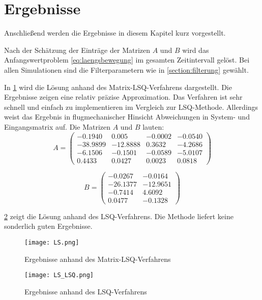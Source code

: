  
 \section{Ergebnisse}
 
Anschließend werden die Ergebnisse in diesem Kapitel kurz vorgestellt.

Nach der Schätzung der Einträge der Matrizen $A$ und $B$ wird das Anfangswertproblem \eqref{eq:laengsbewegung} im gesamten 
Zeitintervall gelöst. Bei allen Simulationen sind die Filterparametern wie in \ref{section:filterung} gewählt.

In \cref{fig:Ergebnisse_zmlsq} wird die Lösung anhand des Matrix-LSQ-Verfahrens dargestellt. Die Ergebnisse zeigen eine 
relativ präzise Approximation. Das Verfahren ist sehr schnell und einfach zu implementieren im Vergleich zur 
LSQ-Methode.  Allerdings weist das Ergebnis in flugmechanischer 
Hinsicht Abweichungen in System- 
und Eingangsmatrix auf. Die Matrizen $A$ und $B$ lauten: 
\begin{equation}
 	A = \begin{pmatrix}
 		-0.1940 & 0.005 & -0.0002 & -0.0540 \\
 		-38.9899 & -12.8888 & 0.3632 & -4.2686 \\
 		-6.1506 & -0.1501 & -0.0589 & -5.0107 \\
 		0.4433 & 0.0427 & 0.0023 & 0.0818
 	\end{pmatrix}
	\nonumber
\end{equation}

\begin{equation}
 	 B = \begin{pmatrix}
 		-0.0267 & -0.0164 \\ 
 		-26.1377 & -12.9651 \\
 		-0.7414 & 4.6092 \\
 		0.0477 & -0.1328
 	\end{pmatrix}
 \nonumber
\end{equation}

 
\cref{fig:Ergebnisse_zlsq} zeigt die Lösung anhand des LSQ-Verfahrens. Die Methode liefert keine sonderlich guten Ergebnisse. 
\begin{figure}[h!]
	\centering
	\texttt{[image: LS.png]}
	\caption{Ergebnisse anhand des Matrix-LSQ-Verfahrens}
    \label{fig:Ergebnisse_zmlsq}
\end{figure}

 \begin{figure}[h!]
	\centering
	\texttt{[image: LS\_LSQ.png]}
	\caption{Ergebnisse anhand des LSQ-Verfahrens}
     \label{fig:Ergebnisse_zlsq} 
\end{figure}

